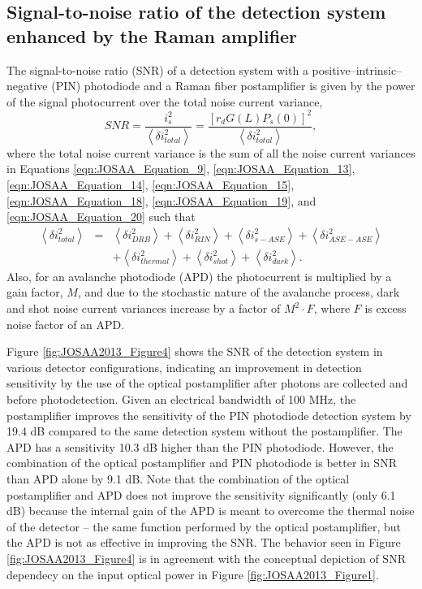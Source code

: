 \subsection{Signal-to-noise ratio of the detection system enhanced by the Raman amplifier}

The signal-to-noise ratio (SNR) of a detection system with a positive--intrinsic--negative (PIN) photodiode and a Raman fiber postamplifier is given by the power of the signal photocurrent over the total noise current variance,
\begin{equation}
{SNR} = \frac{i_s^2}{\left\langle \delta i_{total}^2\right\rangle}=\frac{[r_d G(L) P_s(0)]^2}{\left\langle \delta i_{total}^2\right\rangle},\label{eqn:JOSAA_Equation_22}
\end{equation}
where the total noise current variance is the sum of all the noise current variances in Equations \eqref{eqn:JOSAA_Equation_9}, \eqref{eqn:JOSAA_Equation_13}, \eqref{eqn:JOSAA_Equation_14}, \eqref{eqn:JOSAA_Equation_15}, \eqref{eqn:JOSAA_Equation_18}, \eqref{eqn:JOSAA_Equation_19}, and \eqref{eqn:JOSAA_Equation_20} such that
\begin{eqnarray}
\left\langle \delta i_{total}^2\right\rangle &=&\left\langle \delta i_{DRB}^2\right\rangle+\left\langle \delta i_{RIN}^2\right\rangle+\left\langle \delta i_{s-ASE}^2\right\rangle+\left\langle \delta i_{ASE-ASE}^2\right\rangle \nonumber\\
&&+\left\langle \delta i_{thermal}^2\right\rangle+\left\langle \delta i_{shot}^2\right\rangle+\left\langle \delta i_{dark}^2\right\rangle.\label{eqn:JOSAA_Equation_23}
\end{eqnarray}
Also, for an avalanche photodiode (APD) the photocurrent is multiplied by a gain factor, $M$, and due to the stochastic nature of the avalanche process, dark and shot noise current variances increase by a factor of $M^2 \cdot F$, where $F$ is excess noise factor of an APD.

Figure \ref{fig:JOSAA2013_Figure4} shows the SNR of the detection system in various detector configurations, indicating an improvement in detection sensitivity by the use of the optical postamplifier after photons are collected and before photodetection. Given an electrical bandwidth of 100 MHz, the postamplifier improves the sensitivity of the PIN photodiode detection system by 19.4 dB compared to the same detection system without the postamplifier. The APD has a sensitivity 10.3 dB higher than the PIN photodiode. However, the combination of the optical postamplifier and PIN photodiode is better in SNR than APD alone by 9.1 dB. Note that the combination of the optical postamplifier and APD does not improve the sensitivity significantly (only 6.1 dB) because the internal gain of the APD is meant to overcome the thermal noise of the detector -- the same function performed by the optical postamplifier, but the APD is not as effective in improving the SNR. The behavior seen in Figure \ref{fig:JOSAA2013_Figure4} is in agreement with the conceptual depiction of SNR dependecy on the input optical power in Figure \ref{fig:JOSAA2013_Figure1}.

